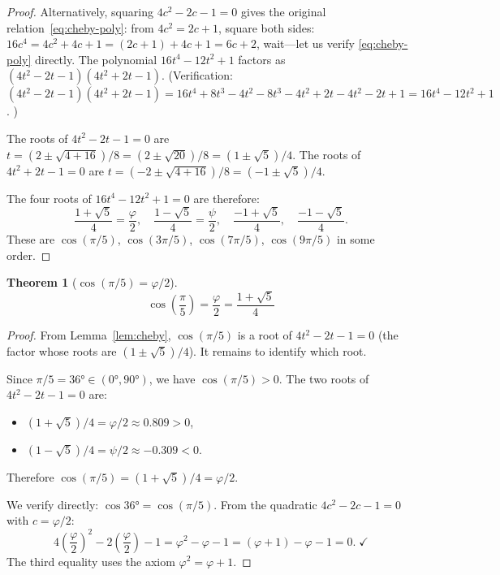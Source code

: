\documentclass[11pt,a4paper]{article}
\theoremstyle{plain}
\newtheorem{theorem}{Theorem}[section]
\theoremstyle{definition}
\begin{document}
\begin{proof}
Alternatively, squaring $4c^2 - 2c - 1 = 0$ gives the original
relation~\eqref{eq:cheby-poly}: from $4c^2 = 2c + 1$, square both sides:
$16c^4 = 4c^2 + 4c + 1 = (2c + 1) + 4c + 1 = 6c + 2$,
wait---let us verify \eqref{eq:cheby-poly} directly.
The polynomial $16t^4 - 12t^2 + 1$ factors as
$(4t^2 - 2t - 1)(4t^2 + 2t - 1)$.
(Verification: $(4t^2 - 2t - 1)(4t^2 + 2t - 1) = 16t^4 + 8t^3 - 4t^2
- 8t^3 - 4t^2 + 2t - 4t^2 - 2t + 1 = 16t^4 - 12t^2 + 1$. \checkmark)

The roots of $4t^2 - 2t - 1 = 0$ are $t = (2 \pm \sqrt{4+16})/8
= (2 \pm \sqrt{20})/8 = (1 \pm \sqrt{5})/4$.
The roots of $4t^2 + 2t - 1 = 0$ are $t = (-2 \pm \sqrt{4+16})/8
= (-1 \pm \sqrt{5})/4$.

The four roots of $16t^4 - 12t^2 + 1 = 0$ are therefore:
\[
  \frac{1+\sqrt{5}}{4} = \frac{\varphi}{2}, \quad
  \frac{1-\sqrt{5}}{4} = \frac{\psi}{2}, \quad
  \frac{-1+\sqrt{5}}{4}, \quad
  \frac{-1-\sqrt{5}}{4}.
\]
These are $\cos(\pi/5)$, $\cos(3\pi/5)$, $\cos(7\pi/5)$, $\cos(9\pi/5)$
in some order.
\end{proof}

\begin{theorem}[$\cos(\pi/5) = \varphi/2$]\label{thm:cos-pi-5}
\begin{equation}\label{eq:cos-pi-5}
  \boxed{\; \cos\!\left(\frac{\pi}{5}\right) = \frac{\varphi}{2}
  = \frac{1+\sqrt{5}}{4} \;}
\end{equation}
\end{theorem}

\begin{proof}
From Lemma~\ref{lem:cheby}, $\cos(\pi/5)$ is a root of
$4t^2 - 2t - 1 = 0$ (the factor whose roots are
$(1 \pm \sqrt{5})/4$).
It remains to identify which root.

Since $\pi/5 = 36° \in (0°, 90°)$, we have $\cos(\pi/5) > 0$.
The two roots of $4t^2 - 2t - 1 = 0$ are:
\begin{itemize}[nosep]
  \item $(1 + \sqrt{5})/4 = \varphi/2 \approx 0.809 > 0$,
  \item $(1 - \sqrt{5})/4 = \psi/2 \approx -0.309 < 0$.
\end{itemize}
Therefore $\cos(\pi/5) = (1 + \sqrt{5})/4 = \varphi/2$.

We verify directly: $\cos 36° = \cos(\pi/5)$.
From the quadratic $4c^2 - 2c - 1 = 0$ with $c = \varphi/2$:
\[
  4\!\left(\frac{\varphi}{2}\right)^{\!2} - 2\!\left(\frac{\varphi}{2}\right) - 1
  = \varphi^2 - \varphi - 1
  = (\varphi + 1) - \varphi - 1
  = 0. \;\checkmark
\]
The third equality uses the axiom $\varphi^2 = \varphi + 1$.
\end{proof}
\end{document}
